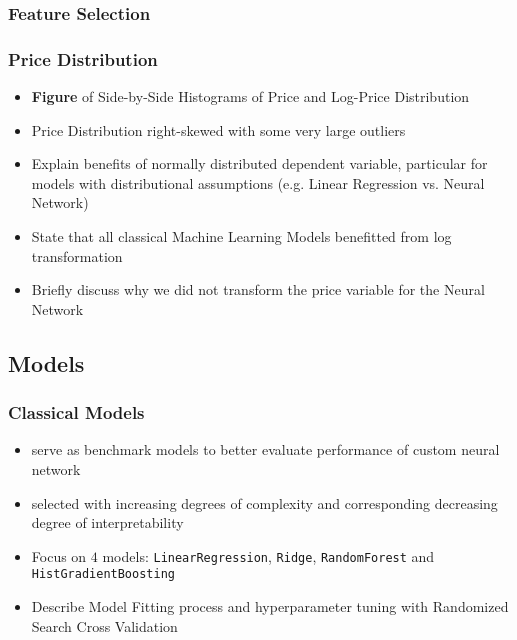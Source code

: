\documentclass[12pt, letterpaper]{article}
\begin{document}
\subsubsection{Feature Selection} %


\subsubsection{Price Distribution} %
\begin{itemize}
    \item \textbf{Figure} of Side-by-Side Histograms of Price and Log-Price Distribution
    \item Price Distribution right-skewed with some very large outliers
    \item Explain benefits of normally distributed dependent variable, particular for models with distributional assumptions (e.g. Linear Regression vs. Neural Network)
    \item State that all classical Machine Learning Models benefitted from log transformation
    \item Briefly discuss why we did not transform the price variable for the Neural Network
\end{itemize}


\subsection{Models} %

\subsubsection{Classical Models} %
\begin{itemize}
    \item serve as benchmark models to better evaluate performance of custom neural network
    \item selected with increasing degrees of complexity and corresponding decreasing degree of interpretability
    \item Focus on $4$ models: \texttt{LinearRegression}, \texttt{Ridge}, \texttt{RandomForest} and \texttt{HistGradientBoosting}
    \item Describe Model Fitting process and hyperparameter tuning with Randomized Search Cross Validation
\end{itemize}
\end{document}
